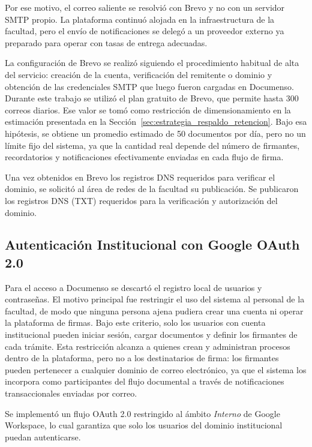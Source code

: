 Por ese motivo, el correo saliente se resolvió con Brevo y no con un servidor SMTP propio. La plataforma continuó alojada en la infraestructura de la facultad, pero el envío de notificaciones se delegó a un proveedor externo ya preparado para operar con tasas de entrega adecuadas.

La configuración de Brevo se realizó siguiendo el procedimiento habitual de alta del servicio: creación de la cuenta, verificación del remitente o dominio y obtención de las credenciales SMTP que luego fueron cargadas en Documenso. Durante este trabajo se utilizó el plan gratuito de Brevo, que permite hasta 300 correos diarios. Ese valor se tomó como restricción de dimensionamiento en la estimación presentada en la Sección~\ref{sec:estrategia_respaldo_retencion}. Bajo esa hipótesis, se obtiene un promedio estimado de 50 documentos por día, pero no un límite fijo del sistema, ya que la cantidad real depende del número de firmantes, recordatorios y notificaciones efectivamente enviadas en cada flujo de firma.

Una vez obtenidos en Brevo los registros DNS requeridos para verificar el dominio, se solicitó al área de redes de la facultad su publicación. Se publicaron los registros DNS (TXT) requeridos para la verificación y autorización del dominio.

\subsection{Autenticación Institucional con Google OAuth 2.0}
\label{subsec:google_oauth}

Para el acceso a Documenso se descartó el registro local de usuarios y contraseñas. El motivo principal fue restringir el uso del sistema al personal de la facultad, de modo que ninguna persona ajena pudiera crear una cuenta ni operar la plataforma de firmas. Bajo este criterio, solo los usuarios con cuenta institucional pueden iniciar sesión, cargar documentos y definir los firmantes de cada trámite. Esta restricción alcanza a quienes crean y administran procesos dentro de la plataforma, pero no a los destinatarios de firma: los firmantes pueden pertenecer a cualquier dominio de correo electrónico, ya que el sistema los incorpora como participantes del flujo documental a través de notificaciones transaccionales enviadas por correo.

Se implementó un flujo OAuth 2.0 restringido al ámbito \textit{Interno} de Google Workspace, lo cual garantiza que solo los usuarios del dominio institucional puedan autenticarse.

